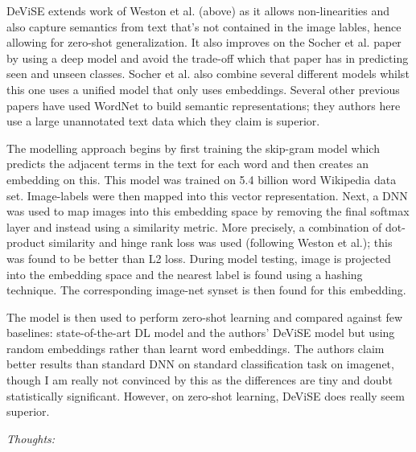 \documentclass[12pt]{report}
\begin{document}
DeViSE extends work of Weston et al. (above) as it allows non-linearities and also capture semantics from text that's not contained in the image lables, hence allowing for zero-shot generalization. It also improves on the Socher et al. paper by using a deep model and avoid the trade-off which that paper has in predicting seen and unseen classes. Socher et al. also combine several different models whilst this one uses a unified model that only uses embeddings. Several other previous papers have used WordNet to build semantic representations; they authors here use a large unannotated text data which they claim is superior.

The modelling approach begins by first training the skip-gram model which predicts the adjacent terms in the text for each word and then creates an embedding on this. This model was trained on 5.4 billion word Wikipedia data set. Image-labels were then mapped into this vector representation. Next, a DNN was used to map images into this embedding space by removing the final softmax layer and instead using a similarity metric. More precisely, a combination of dot-product similarity and hinge rank loss was used (following Weston et al.); this was found to be better than L2 loss. During model testing, image is projected into the embedding space and the nearest label is found using a hashing technique. The corresponding image-net synset is then found for this embedding.

The model is then used to perform zero-shot learning and compared against few baselines: state-of-the-art DL model and the authors' DeViSE model but using random embeddings rather than learnt word embeddings. The authors claim better results than standard DNN on standard classification task on imagenet, though I am really not convinced by this as the differences are tiny and doubt statistically significant. However, on zero-shot learning, DeViSE does really seem superior. 

\textit{Thoughts:}
\end{document}

